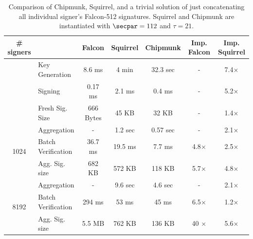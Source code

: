 \begin{table}\centering
  \begin{tabular}{clccccc}
    \# signers      &                 & Falcon      & Squirrel  & Chipmunk  & Imp. Falcon & Imp. Squirrel \\\toprule
    \multirow{2}{*}{} 
                    & Key Generation  & 8.6 ms      & 4 min     & 32.3 sec  &     -       & 7.4$\times$ \\%
                    & Signing         & 0.17 ms     & 2.1 ms    & 0.4 ms    &     -       & 5.2$\times$ \\%
                    &Fresh Sig. Size  & 666 Bytes   & 45 KB     & 32 KB     &     -       & 1.4$\times$ \\\midrule
    \multirow{3}{*}{1024}                
                    &Aggregation      & -           & 1.2 sec   & 0.57 sec  &     -       & 2.1$\times$ \\%
                    &Batch Verification    
                                      & 36.7 ms     & 19.5 ms   & 7.7 ms    & 4.8$\times$ & 2.5$\times$ \\%
                    
                    &Agg. Sig. size   & 682 KB      & 572 KB    & 118 KB    & 5.7$\times$ & 4.8$\times$ \\\midrule
    \multirow{3}{*}{8192}                
                    &Aggregation      & -           & 9.6 sec   & 4.6 sec   &     -       & 2.1$\times$ \\%
                    &Batch Verification    
                                      & 294 ms      & 53  ms    &  45 ms    & 6.5$\times$ & 1.2$\times$ \\%
                    &Agg. Sig. size   & 5.5 MB      & 762 KB    & 136 KB    & 40 $\times$ & 5.6$\times$\\ \bottomrule
  \end{tabular}
  \caption{Comparison of Chipmunk, Squirrel, and a trivial solution of just concatenating all individual signer's Falcon-512 signatures. Squirrel and Chipmunk are instantiated with $\secpar = 112$ and $\tau=21$. %
  }\label{tab:benchmarksizes}
\end{table}

